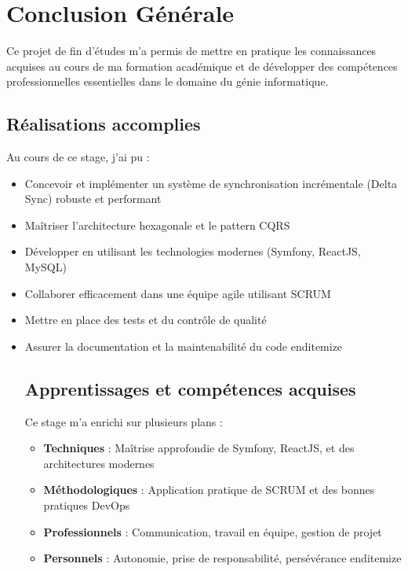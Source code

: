 \chapter*{Conclusion Générale}

Ce projet de fin d'études m'a permis de mettre en pratique les connaissances acquises au cours de ma formation académique et de développer des compétences professionnelles essentielles dans le domaine du génie informatique.

\section*{Réalisations accomplies}

Au cours de ce stage, j'ai pu :

\begin{itemize}
    \item Concevoir et implémenter un système de synchronisation incrémentale (Delta Sync) robuste et performant
    \item Maîtriser l'architecture hexagonale et le pattern CQRS
    \item Développer en utilisant les technologies modernes (Symfony, ReactJS, MySQL)
    \item Collaborer efficacement dans une équipe agile utilisant SCRUM
    \item Mettre en place des tests et du contrôle de qualité
    \item Assurer la documentation et la maintenabilité du code
end{itemize}

\section*{Apprentissages et compétences acquises}

Ce stage m'a enrichi sur plusieurs plans :

\begin{itemize}
    \item \textbf{Techniques} : Maîtrise approfondie de Symfony, ReactJS, et des architectures modernes
    \item \textbf{Méthodologiques} : Application pratique de SCRUM et des bonnes pratiques DevOps
    \item \textbf{Professionnels} : Communication, travail en équipe, gestion de projet
    \item \textbf{Personnels} : Autonomie, prise de responsabilité, persévérance
end{itemize}


\end{itemize}
\end{itemize}
